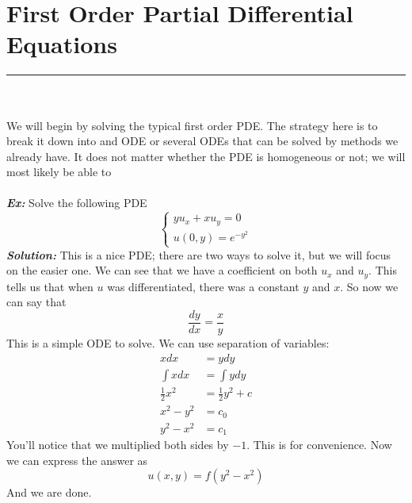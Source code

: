 \documentclass{article}
\begin{document}
\section{First Order Partial Differential Equations}
\hrule
\noindent\\\\
\indent We will begin by solving the typical first order PDE. The strategy here is to break it down into and ODE or several ODEs that can be solved by methods we already have. It does not matter whether the PDE is homogeneous or not; we will most likely be able to \\\\
\noindent\textbf{\textit{Ex:}} Solve the following PDE
\[
\begin{cases*}
yu_{x} + xu_{y} = 0\\
u(0,y) = e^{-y^{2}}
\end{cases*}
\]
\indent \textbf{\textit{Solution:}} This is a nice PDE; there are two ways to solve it, but we will focus on the easier one. We can see that we have a coefficient on both $u_{x}$ and $u_{y}$. This tells us that when $u$ was differentiated, there was a constant $y$ and $x$. So now we can say that
\[
\frac{dy}{dx} = \frac{x}{y}
\]
\noindent This is a simple ODE to solve. We can use separation of variables:
\begin{align*}
xdx &= ydy\\
\int{x dx} &= \int{y dy}\\
\frac{1}{2}x^{2} &= \frac{1}{2}y^{2} + c\\
x^{2} - y^{2} &= c_{0}\\
y^{2} - x^{2} &= c_{1}
\end{align*}
\noindent You'll notice that we multiplied both sides by $-1$. This is for convenience. Now we can express the answer as
\[
u(x,y) = f(y^{2} - x^{2})
\]
\noindent And we are done.
\end{document}
